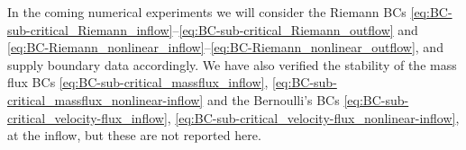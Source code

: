 \documentclass{article}
\numberwithin{equation}{section}
\theoremstyle{definition}
\begin{document}
In the coming numerical experiments we will consider the Riemann BCs \eqref{eq:BC-sub-critical_Riemann_inflow}--\eqref{eq:BC-sub-critical_Riemann_outflow} and \eqref{eq:BC-Riemann_nonlinear_inflow}--\eqref{eq:BC-Riemann_nonlinear_outflow}, and supply boundary data accordingly. We have also verified the stability of the  mass flux BCs \eqref{eq:BC-sub-critical_massflux_inflow}, \eqref{eq:BC-sub-critical_massflux_nonlinear-inflow} and the Bernoulli's BCs \eqref{eq:BC-sub-critical_velocity-flux_inflow}, \eqref{eq:BC-sub-critical_velocity-flux_nonlinear-inflow}, at the inflow, but these are not reported here.
\end{document}
